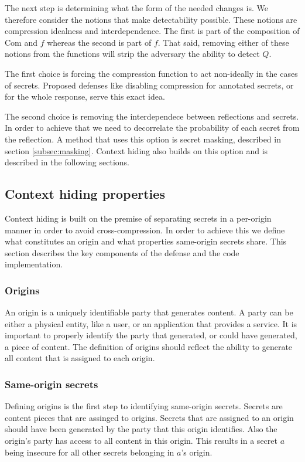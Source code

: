 \documentclass[conference, letterpaper, 10pt]{IEEEtran}
\begin{document}
The next step is determining what the form of the needed changes is. We
therefore consider the notions that make detectability possible.
These notions are compression idealness and interdependence. The first is part
of the composition of $\textrm{Com}$ and $f$ whereas the second is part of $f$. That
said, removing either of these notions from the functions will strip the
adversary the ability to detect $Q$.

The first choice is forcing the compression function to act non-ideally in the
cases of secrets. Proposed defenses like disabling compression for annotated
secrets, or for the whole response, serve this exact idea.

The second choice is removing the interdependece between reflections and
secrets. In order to achieve that we need to decorrelate the probability of each
secret from the reflection. A method that uses this option is secret masking,
described in section \ref{subsec:masking}. Context hiding also builds on this
option and is described in the following sections.

\subsection{Context hiding properties}

Context hiding is built on the premise of separating secrets in a per-origin
manner in order to avoid cross-compression. In order to achieve this we define
what constitutes an origin and what properties same-origin secrets share. This
section describes the key components of the defense and the code implementation.

\subsubsection{Origins}
An origin is a uniquely identifiable party that generates content. A party can
be either a physical entity, like a user, or an application that provides a
service. It is important to properly identify the party that generated, or could
have generated, a piece of content. The definition of origins should reflect the
ability to generate all content that is assigned to each origin.

\subsubsection{Same-origin secrets}
Defining origins is the first step to identifying same-origin secrets. Secrets
are content pieces that are assinged to origins. Secrets that are assigned to an
origin should have been generated by the party that this origin identifies.
Also the origin's party has access to all content in this origin. This results
in a secret $a$ being insecure for all other secrets belonging in $a$'s origin.
\end{document}

